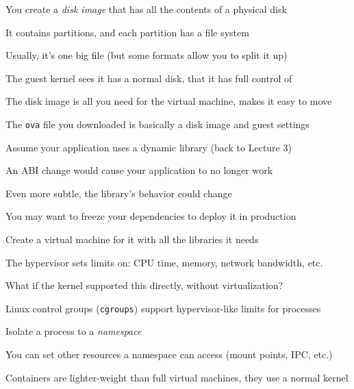   \begin{slide}
    

    You create a \textit{disk image} that has all the contents of a physical
    disk

    \leftspace{}It contains partitions, and each partition has a file system
    \medskip

    Usually, it's one big file (but some formats allow you to split it up)

    \leftspace{}The guest kernel sees it has a normal disk, that it has full
                 control of
    \medskip

    The disk image is all you need for the virtual machine, makes it easy to
    move

    \leftspace{}The \texttt{ova} file you downloaded is basically a disk image
                 and guest settings

  \end{slide}

  \begin{slide}
    

    Assume your application uses a dynamic library (back to Lecture 3)

    \leftspace{}An ABI change would cause your application to no longer work

    \hspace{4em} Even more subtle, the library's behavior could change
    \medskip

    You may want to freeze your dependencies to deploy it in production

    \leftspace{}Create a virtual machine for it with all the libraries it
                 needs

  \end{slide}

  \begin{slide}
    

    The hypervisor sets limits on: CPU time, memory, network bandwidth, etc.

    \leftspace{}What if the kernel supported this directly, without
                 virtualization?
    \medskip

    Linux control groups (\texttt{cgroups}) support hypervisor-like
    limits for processes

    \leftspace{}Isolate a process to a \textit{namespace}
    \medskip

    You can set other resources a namespace can access (mount points, IPC, etc.)
    \medskip

    Containers are lighter-weight than full virtual machines, they use a normal
    kernel

  \end{slide}

